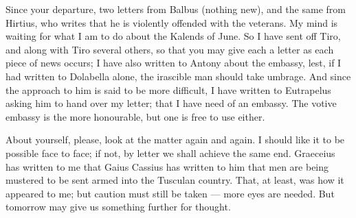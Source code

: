 

 Since your departure, two letters from Balbus (nothing new), and the same from Hirtius, who writes that he is violently offended with the veterans. My mind is waiting for what I am to do about the Kalends of June. So I have sent off Tiro, and along with Tiro several others, so that you may give each a letter as each piece of news occurs; I have also written to Antony about the embassy, lest, if I had written to Dolabella alone, the irascible man should take umbrage. And since the approach to him is said to be more difficult, I have written to Eutrapelus asking him to hand over my letter; that I have need of an embassy. The votive embassy is the more honourable, but one is free to use either.

 About yourself, please, look at the matter again and again. I should like it to be possible face to face; if not, by letter we shall achieve the same end. Graeceius has written to me that Gaius Cassius has written to him that men are being mustered to be sent armed into the Tusculan country. That, at least, was how it appeared to me; but caution must still be taken --- more eyes are needed. But tomorrow may give us something further for thought.
